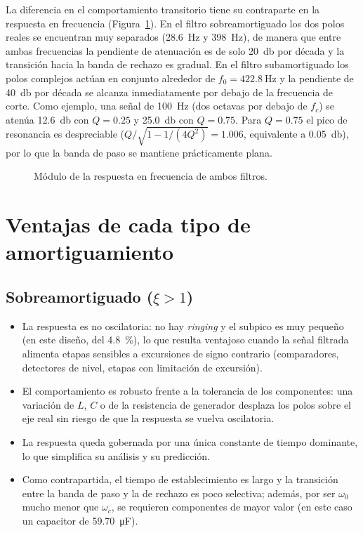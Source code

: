 La diferencia en el comportamiento transitorio tiene su contraparte en la respuesta en frecuencia
(Figura~\ref{fig:bode-comparacion}). En el filtro sobreamortiguado los dos polos reales se encuentran muy
separados (\qty{28.6}{\hertz} y \qty{398}{\hertz}), de manera que entre ambas frecuencias la pendiente de
atenuación es de solo \qty{20}{\decibel} por década y la transición hacia la banda de rechazo es gradual.
En el filtro subamortiguado los polos complejos actúan en conjunto alrededor de $f_0 = \qty{422.8}{\hertz}$ y
la pendiente de \qty{40}{\decibel} por década se alcanza inmediatamente por debajo de la frecuencia de corte.
Como ejemplo, una señal de \qty{100}{\hertz} (dos octavas por debajo de $f_c$) se atenúa
\qty{12.6}{\decibel} con $Q = \num{0.25}$ y \qty{25.0}{\decibel} con $Q = \num{0.75}$. Para $Q = \num{0.75}$
el pico de resonancia es despreciable ($Q/\sqrt{1 - 1/(4Q^2)} = \num{1.006}$, equivalente a
\qty{0.05}{\decibel}), por lo que la banda de paso se mantiene prácticamente plana.

\begin{figure}[!ht]
  \centering
  
  \caption{Módulo de la respuesta en frecuencia de ambos filtros.}
  \label{fig:bode-comparacion}
\end{figure}

\section{Ventajas de cada tipo de amortiguamiento}

\subsection{Sobreamortiguado ($\xi > 1$)}

\begin{itemize}
  \item La respuesta es no oscilatoria: no hay \emph{ringing} y el subpico es muy pequeño (en este diseño,
        del \qty{4.8}{\percent}), lo que resulta ventajoso cuando la señal filtrada alimenta etapas sensibles
        a excursiones de signo contrario (comparadores, detectores de nivel, etapas con limitación de
        excursión).
  \item El comportamiento es robusto frente a la tolerancia de los componentes: una variación de $L$, $C$ o
        de la resistencia de generador desplaza los polos sobre el eje real sin riesgo de que la respuesta
        se vuelva oscilatoria.
  \item La respuesta queda gobernada por una única constante de tiempo dominante, lo que simplifica su
        análisis y su predicción.
  \item Como contrapartida, el tiempo de establecimiento es largo y la transición entre la banda de paso y
        la de rechazo es poco selectiva; además, por ser $\omega_0$ mucho menor que $\omega_c$, se requieren
        componentes de mayor valor (en este caso un capacitor de \qty{59.70}{\micro\farad}).
\end{itemize}

